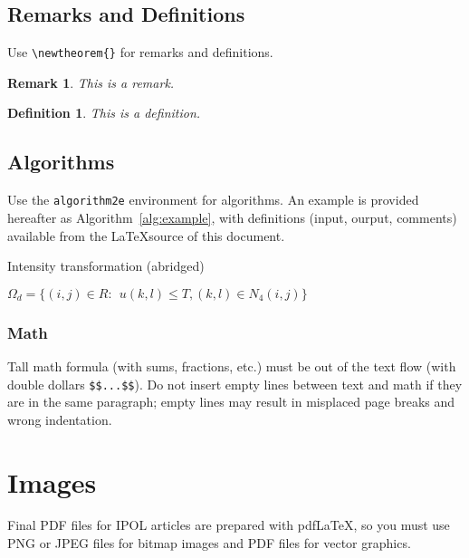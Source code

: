 \documentclass{ipol}
\newtheorem{definition}{Definition}
\newtheorem*{remark}{Remark}
\begin{document}
\subsection{Remarks and Definitions}

Use \verb|\newtheorem{}| for remarks and definitions.

\begin{remark}
  This is a remark.
\end{remark}

\begin{definition}
  This is a definition.
\end{definition}

\subsection{Algorithms}

Use the \verb|algorithm2e| environment for
algorithms. An example is provided hereafter as
Algorithm~\ref{alg:example}, with definitions (input, ourput,
comments) available from the \LaTeX source of this document.

\begin{algorithm}[!htbp]
\caption{Intensity transformation (abridged)}
\DontPrintSemicolon
{}
$\Omega_d=\{(i, j)\in R: \ \ u(k,l) \leq T, (k,l) \in N_4(i,j)\}$
\label{alg:example}
\end{algorithm}

\subsubsection{Math}

Tall math formula (with sums, fractions, etc.) must be out of the text
flow (with double dollars
\verb|$$...$$|). Do not insert empty lines between text and math
if they are in the same paragraph; empty lines may result in misplaced page
breaks and wrong indentation.

\section{Images}

Final PDF files for IPOL articles are prepared with pdf\LaTeX, so you
must use PNG or JPEG files for bitmap images and PDF files for vector
graphics.
\end{document}
